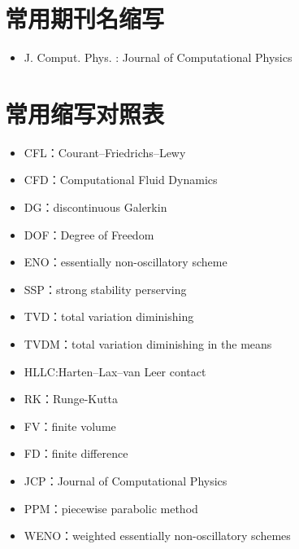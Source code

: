 \documentclass{book}
\begin{document}
\section{常用期刊名缩写}
\begin{itemize}
    \item J. Comput. Phys. : Journal of Computational Physics
\end{itemize}
\section{常用缩写对照表}
\begin{itemize}
    \item CFL：Courant–Friedrichs–Lewy
    \item CFD：Computational Fluid Dynamics
    \item DG：discontinuous Galerkin
    \item DOF：Degree of Freedom
    \item ENO：essentially non-oscillatory scheme
    \item SSP：strong stability perserving
    \item TVD：total variation diminishing
    \item TVDM：total variation diminishing in the means
    \item HLLC:Harten–Lax–van Leer contact
    \item RK：Runge-Kutta
    \item FV：finite volume
    \item FD：finite difference
    \item JCP：Journal of Computational Physics
    \item PPM：piecewise parabolic method
    \item WENO：weighted essentially non-oscillatory schemes
\end{itemize}


\end{document}
